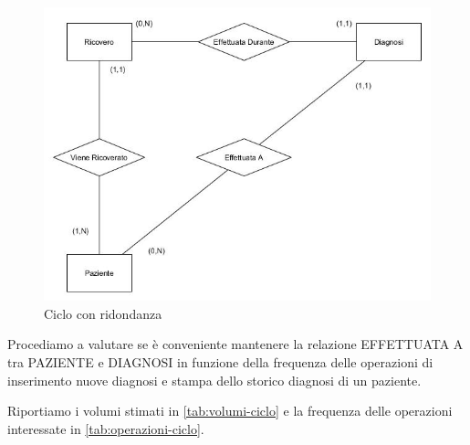 \documentclass{article}
\begin{document}
\begin{figure}[H] %
	\centering
	\includegraphics[width=\linewidth]{schema3}
	\caption{Ciclo con ridondanza}
	\label{fig:ciclo-ridondanza}
\end{figure}
Procediamo a valutare se è conveniente mantenere la relazione EFFETTUATA A tra PAZIENTE e DIAGNOSI in funzione della frequenza delle operazioni di inserimento nuove diagnosi e stampa dello storico diagnosi di un paziente.


Riportiamo i volumi stimati in \autoref{tab:volumi-ciclo} e la frequenza delle operazioni interessate in \autoref{tab:operazioni-ciclo}.
\end{document}
